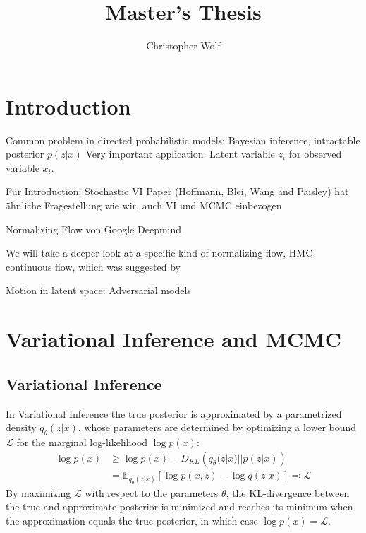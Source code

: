 \documentclass[12pt]{scrartcl}
\newcommand{\E}{\mathbb{E}}
\begin{document}
\pagestyle{fancyplain}

\title{Master's Thesis}
\author{Christopher Wolf}
\date{\vspace{-5ex}}
\maketitle

\section{Introduction}

Common problem in directed probabilistic models: Bayesian inference, intractable posterior $p(z|x)$
Very important application: Latent variable $z_i$ for observed variable $x_i$.

Für Introduction: Stochastic VI Paper (Hoffmann, Blei, Wang and Paisley) hat ähnliche Fragestellung wie wir, auch VI und MCMC einbezogen

Normalizing Flow von Google Deepmind \citep{Rezende2015}

We will take a deeper look at a specific kind of normalizing flow, HMC continuous flow, which was suggested by \citep{Salimans2014} 

Motion in latent space: Adversarial models

\section{Variational Inference and MCMC}

\subsection{Variational Inference}

In Variational Inference the true posterior is approximated by a parametrized density $q_{\theta}(z|x)$, whose parameters are determined by optimizing a lower bound $\mathcal{L}$ for the marginal log-likelihood $\log p(x)$:
\begin{equation}
\begin{split}
\log p(x) &\geq \log p(x) - D_{KL} \left( q_{\theta}(z|x) || p(z|x) \right) \\
			   &=  \E_{q_{\theta}(z|x)} \left[ \log p(x, z) - \log q(z|x) \right] \eqqcolon \mathcal{L}
\end{split}
\end{equation}
By maximizing $\mathcal{L}$ with respect to the parameters $\theta$, the KL-divergence between the true and approximate posterior is minimized and reaches its minimum when the approximation equals the true posterior, in which case $\log p(x) = \mathcal{L}$. 
\end{document}
